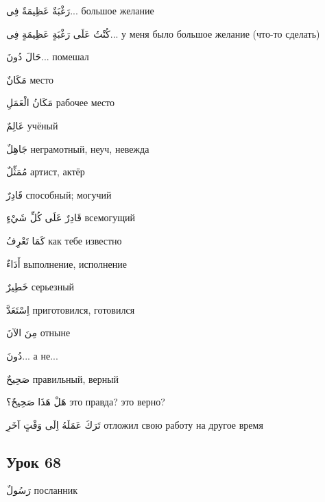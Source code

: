 \documentclass[a5paper]{article}
\newcommand\textstyleDropCaps[1]{#1}
\newcommand\textstyleCaptioncharacters[1]{#1}
\begin{document}
\textstyleCaptioncharacters{رَغْبَةٌ عَظِيمَةٌ فِى...ِ }\textstyleDropCaps{большое желание‎}

\textstyleCaptioncharacters{كُنْتُ عَلَى رَغْبَةٍ عَظِيمَةٍ فِى...ِ }\textstyleDropCaps{у меня было большое желание (что-то сделать)‎}

\textstyleCaptioncharacters{حَالَ دُونَ...ِ }\textstyleDropCaps{помешал‎}

\textstyleCaptioncharacters{مَكَانٌ }\textstyleDropCaps{место‎}

\textstyleCaptioncharacters{مَكَانُ الْعَمَلِ }\textstyleDropCaps{рабочее ме­сто‎}

\textstyleCaptioncharacters{عَالِمٌ }\textstyleDropCaps{учёный‎}

\textstyleCaptioncharacters{جَاهِلٌ }\textstyleDropCaps{неграмотный, неуч, невежда‎}

\textstyleCaptioncharacters{مُمَثِّلٌ }\textstyleDropCaps{артист, актёр‎}

\textstyleCaptioncharacters{قَادِرٌ }\textstyleDropCaps{способный; могучий‎}

\textstyleCaptioncharacters{قَادِرٌ عَلَى كُلِّ شَيْءٍ }\textstyleDropCaps{всемогущий‎}

\textstyleCaptioncharacters{كَمَا تَعْرِفُ }\textstyleDropCaps{как тебе из­вестно‎}

\textstyleCaptioncharacters{أَدَاءٌ }\textstyleDropCaps{выполнение, исполне­ние‎}

\textstyleCaptioncharacters{خَطِيرٌ }\textstyleDropCaps{серьезный‎}

\textstyleCaptioncharacters{اِسْتَعَدَّ }\textstyleDropCaps{приготовился, го­товился‎}

\textstyleCaptioncharacters{مِنَ الآنَ }\textstyleDropCaps{отныне‎}

\textstyleCaptioncharacters{دُونَ...ِ }\textstyleDropCaps{а не...‎}

\textstyleCaptioncharacters{صَحِيحٌ }\textstyleDropCaps{правильный, вер­ный‎}

\textstyleCaptioncharacters{هَلْ هَذَا صَحِيحٌ؟ }\textstyleDropCaps{это правда? это верно?‎}

\textstyleCaptioncharacters{تَرَكَ عَمَلَهُ اِلَى وَقْتٍ آخَرِ }\textstyleDropCaps{отложил свою работу на другое время‎}

\subsection[Урок 68‎]{\textstyleDropCaps{Урок 68‎}}
\textstyleCaptioncharacters{رَسُولٌ }\textstyleDropCaps{посланник‎}
\end{document}
